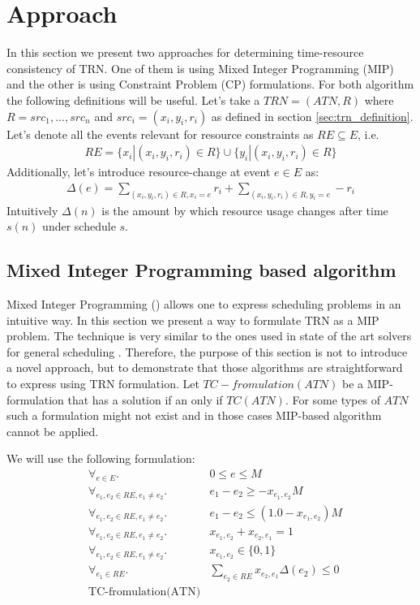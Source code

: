 \section{Approach}
In this section we present two approaches for determining time-resource consistency of TRN. One of them is using Mixed Integer Programming (MIP) and the other is using Constraint Problem (CP) formulations. For both algorithm the following definitions will be useful.
Let's take a $TRN=(ATN, R)$ where $R={src_1, ..., src_n}$ and $src_i = (x_i, y_i, r_i)$ as defined in section \ref{sec:trn_definition}. Let's denote all the events relevant for resource constraints as $RE \subseteq E$, i.e.
\begin{align*}
RE = \{ x_i | (x_i, y_i, r_i) \in R \} \cup \{ y_i | (x_i, y_i, r_i) \in R \}
\end{align*}
Additionally, let's introduce resource-change at event $e \in E$ as:
\begin{align*}
\Delta(e) = \sum_{(x_i, y_i, r_i) \in R, x_i = e} r_i + \sum_{(x_i, y_i, r_i) \in R, y_i = e} -r_i
\end{align*}
Intuitively $\Delta(n)$ is the amount by which resource usage changes after time $s(n)$ under schedule $s$.

\subsection{Mixed Integer Programming based algorithm}
Mixed Integer Programming (\cite{markowitz1957solution}) allows one to express scheduling problems in an intuitive way. In this section we present a way to formulate TRN as a MIP problem. The technique is very similar to the ones used in state of the art solvers for general scheduling  \cite{patterson1984comparison} \cite{bartusch1988scheduling}. Therefore, the purpose of this section is not to introduce a novel approach, but to demonstrate that those algorithms are straightforward to express using TRN formulation. Let $TC-fromulation(ATN)$ be a MIP-formulation that has a solution if an only if $TC(ATN)$. For some types of $ATN$ such a formulation might not exist and in those cases MIP-based algorithm cannot be applied.

We will use the following formulation:
\begin{align}
\label{eq:mip0} & \forall_{e \in E}.              & 0 \leq e \leq M \\
\label{eq:mip1} & \forall_{e_1, e_2 \in RE, e_1 \neq e_2}. & e_1 - e_2 \geq - x_{e_1,e_2} M \\
\label{eq:mip2} & \forall_{e_1, e_2 \in RE, e_1 \neq e_2}. & e_1 - e_2 \leq (1.0 - x_{e_1,e_2}) M\\
\label{eq:mip3} & \forall_{e_1, e_2 \in RE, e_1 \neq e_2}. & x_{e_1,e_2} + x_{e_2,e_1}  = 1\\
\label{eq:mip4} & \forall_{e_1, e_2 \in RE, e_1 \neq e_2}. & x_{e_1,e_2} \in \{ 0, 1 \} \\
\label{eq:mip5} & \forall_{e_1 \in RE}.                    & \sum_{e_2 \in RE} x_{e_2, e_1} \Delta(e_2) \leq 0\\
\label{eq:mip6} & \text{TC-fromulation(ATN)}
\end{align}

